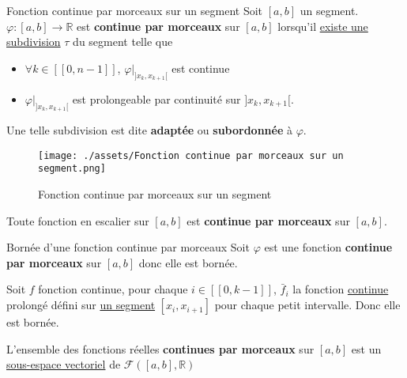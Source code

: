 \begin{Definition}[colbacktitle=red!75!black]{Fonction continue par morceaux sur un segment}{}
  Soit $[a,b]$ un segment. $\varphi : [a,b] \to \mathbb{R}$ est \textbf{continue par morceaux} sur $[a,b]$ lorsqu'il \underline{existe une subdivision} $\tau$ du segment telle que 
  \begin{itemize}

    \item $\forall k \in [\![0, n-1]\!]$, $\varphi| _{]x_k, x _{k+1}[}$ est continue
      
    \item $\varphi | _{]x_k, x _{k+1}[}$ est prolongeable par continuité sur $]x_k, x _{k+1}[$. 

  \end{itemize}
  Une telle subdivision est dite \textbf{adaptée} ou \textbf{subordonnée} à $\varphi$.

  \begin{figure}[H] %
    \centering
    \texttt{[image: ./assets/Fonction continue par morceaux sur un segment.png]}
    \caption{Fonction continue par morceaux sur un segment}
    \label{fig:Fonction continue par morceaux sur un segment}
  \end{figure}

  

\end{Definition}

Toute fonction en escalier sur $[a,b]$ est \textbf{continue par morceaux} sur $[a,b]$.

\begin{Prop}{Bornée d'une fonction continue par morceaux}{}
  Soit $\varphi$ est une fonction \textbf{continue par morceaux} sur $[a,b]$ donc elle est bornée.
\end{Prop}

\begin{myproof}{}{}
  Soit $f$ fonction continue, pour chaque $i \in [\![0, k-1]\!]$, $\bar{f}_i$ la fonction \underline{continue} prolongé défini sur \underline{un segment} $[x_i, x _{i+1}]$ pour chaque petit intervalle. Donc elle est bornée.
\end{myproof}

\begin{Prop}{}{}
  L'ensemble des fonctions réelles \textbf{continues par morceaux} sur $[a,b]$ est un \underline{sous-espace vectoriel} de $\mathcal{F}([a,b], \mathbb{R})$
\end{Prop}

